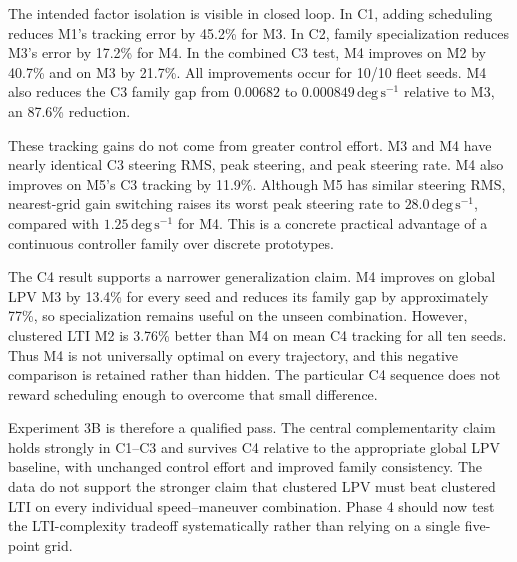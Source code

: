 The intended factor isolation is visible in closed loop.  In C1, adding
scheduling reduces M1's tracking error by 45.2\% for M3.  In C2, family
specialization reduces M3's error by 17.2\% for M4.  In the combined C3 test,
M4 improves on M2 by 40.7\% and on M3 by 21.7\%.  All improvements occur for
10/10 fleet seeds.  M4 also reduces the C3 family gap from
$0.00682$ to $0.000849\,\mathrm{deg\,s^{-1}}$ relative to M3, an 87.6\%
reduction.

These tracking gains do not come from greater control effort.  M3 and M4 have
nearly identical C3 steering RMS, peak steering, and peak steering rate.  M4
also improves on M5's C3 tracking by 11.9\%.  Although M5 has similar steering
RMS, nearest-grid gain switching raises its worst peak steering rate to
$28.0\,\mathrm{deg\,s^{-1}}$, compared with $1.25\,\mathrm{deg\,s^{-1}}$ for
M4.  This is a concrete practical advantage of a continuous controller family
over discrete prototypes.

The C4 result supports a narrower generalization claim.  M4 improves on global
LPV M3 by 13.4\% for every seed and reduces its family gap by approximately
77\%, so specialization remains useful on the unseen combination.  However,
clustered LTI M2 is 3.76\% better than M4 on mean C4 tracking for all ten seeds.
Thus M4 is not universally optimal on every trajectory, and this negative
comparison is retained rather than hidden.  The particular C4 sequence does not
reward scheduling enough to overcome that small difference.

Experiment 3B is therefore a qualified pass.  The central complementarity claim
holds strongly in C1--C3 and survives C4 relative to the appropriate global LPV
baseline, with unchanged control effort and improved family consistency.  The
data do not support the stronger claim that clustered LPV must beat clustered
LTI on every individual speed--maneuver combination.  Phase 4 should now test
the LTI-complexity tradeoff systematically rather than relying on a single
five-point grid.
